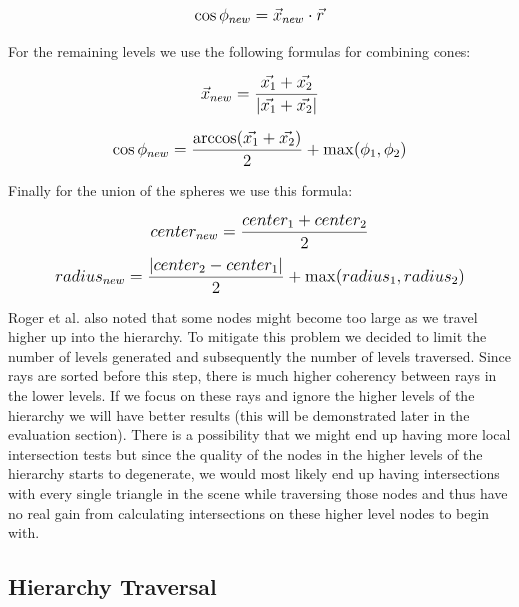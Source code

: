 \begin{equation}
    \mathlarger{\cos{\phi_{new}} = \vec{x}_{new} \cdot \vec{r}}
\end{equation}

For the remaining levels we use the following formulas for combining cones:

\begin{equation}
    \mathlarger{\vec{x}_{new} = \frac{ \vec{x_{1}} + \vec{x_{2}} }
                                     {|\vec{x_{1}} + \vec{x_{2}}|}}
\end{equation}

\begin{equation}        
    \mathlarger{\cos{\phi_{new}} = \frac{\arccos(\vec{x_{1}} + \vec{x_{2}})}{2} + \max(\phi_{1}, \phi_{2})}
\end{equation}

Finally for the union of the spheres we use this formula:

\begin{equation}
    \mathlarger{center_{new} = \frac{center_{1} + center_{2}}{2}}
\end{equation}
\begin{equation}
    \mathlarger{radius_{new} = \frac{|center_{2} - center_{1}|}{2} + \max(radius_{1},radius_{2})}
\end{equation}

\medskip

Roger et al. \cite{Roger07} also noted that some nodes might become too large as we travel higher up into the hierarchy. To mitigate this problem we decided to limit the number of levels generated and subsequently the number of levels traversed. Since rays are sorted before this step, there is much higher coherency between rays in the lower levels. If we focus on these rays and ignore the higher levels of the hierarchy we will have better results (this will be demonstrated later in the evaluation section). There is a possibility that we might end up having more local intersection tests but since the quality of the nodes in the higher levels of the hierarchy starts to degenerate, we would most likely end up having intersections with every single triangle in the scene while traversing those nodes and thus have no real gain from calculating intersections on these higher level nodes to begin with.

\subsection{Hierarchy Traversal}

